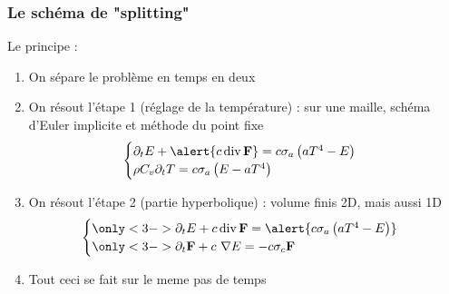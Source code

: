 \begin{frame}
  \frametitle{Le schéma de "splitting"}
  Le principe :
  \footnotesize
  \begin{enumerate}
    \item<1-> On sépare le problème en temps en deux
    \item<2-> On résout l'étape 1 (réglage de la température) : sur une maille, schéma d'Euler implicite et méthode du point fixe
    $$     \begin{cases}
      \partial_tE + \alert{c \operatorname {div} \bvec F} = c\sigma_a\left(aT^4-E\right)\\
      \rho C_v \partial_t T = c \sigma_a \left(E-aT^4\right) 
     \end{cases} $$
    \item<3-> On résout l'étape 2 (partie hyperbolique) : volume finis 2D, mais aussi 1D
    $$     \begin{cases}
      \only<3->{\partial_tE + c \operatorname {div} \bvec F = \alert{c\sigma_a\left(aT^4-E\right)}}\\
      \only<3->{\partial_t\bvec{F} + c \ \nabla E = -c\sigma_c \bvec{F}} \\
     \end{cases} $$
    \item<4> \alert {Tout ceci se fait sur le meme pas de temps}
  \end{enumerate}

\end{frame}


